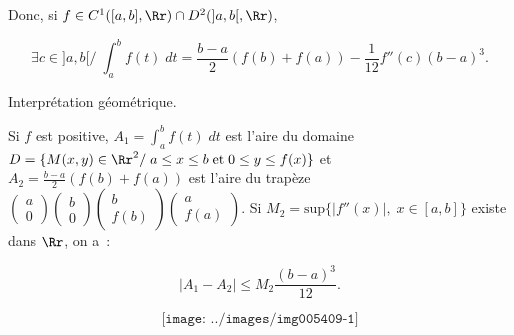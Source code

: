 {{Donc, si $f\in C^1([a,b],\Rr)\cap D^2(]a,b[,\Rr)$, 

$$\exists c\in]a,b[/\;\int_{a}^{b}f(t)\;dt=\frac{b-a}{2}(f(b)+f(a))-\frac{1}{12}f''(c)(b-a)^3.$$

Interprétation géométrique.

Si $f$ est positive, $A_1=\int_{a}^{b}f(t)\;dt$ est l'aire du domaine $D=\{M(x,y)\in\Rr^2/\;a\leq x\leq b\;\mbox{et}\;0\leq y\leq f(x)\}$ et $A_2=\frac{b-a}{2}(f(b)+f(a))$ est l'aire du trapèze $\left(
\begin{array}{c}
a\\
0
\end{array}
\right)\left(
\begin{array}{c}
b\\
0
\end{array}
\right)\left(
\begin{array}{c}
b\\
f(b)
\end{array}
\right)\left(
\begin{array}{c}
a\\
f(a)
\end{array}
\right)$. Si $M_2=\mbox{sup}\{|f''(x)|,\;x\in[a,b]\}$ existe dans $\Rr$, on a~:

$$|A_1-A_2|\leq M_2\frac{(b-a)^3}{12}.$$

$$\texttt{[image: ../images/img005409-1]}$$
}
}
